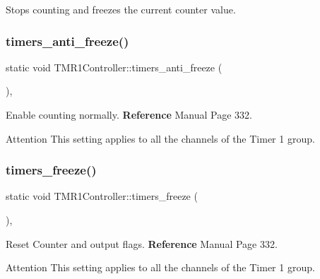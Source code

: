 Stops counting and freezes the current counter value. 

\mbox{\label{classTMR1Controller_acb383aa5321f552f018e4e217e2211f4}} 
\subsubsection{\texorpdfstring{timers\+\_\+anti\+\_\+freeze()}{timers\_anti\_freeze()}}
{\footnotesize\ttfamily static void T\+M\+R1\+Controller\+::timers\+\_\+anti\+\_\+freeze (\begin{DoxyParamCaption}{ }\end{DoxyParamCaption})\hspace{0.3cm}{\ttfamily [inline]}, {\ttfamily [static]}}



Enable counting normally. {\bfseries Reference} Manual Page 332. 

\begin{DoxyAttention}{Attention}
This setting applies to all the channels of the Timer 1 group. 
\end{DoxyAttention}
\mbox{\label{classTMR1Controller_aa00df5e2d591a36b1049275c9a293c51}} 
\subsubsection{\texorpdfstring{timers\+\_\+freeze()}{timers\_freeze()}}
{\footnotesize\ttfamily static void T\+M\+R1\+Controller\+::timers\+\_\+freeze (\begin{DoxyParamCaption}{ }\end{DoxyParamCaption})\hspace{0.3cm}{\ttfamily [inline]}, {\ttfamily [static]}}



Reset Counter and output flags. {\bfseries Reference} Manual Page 332. 

\begin{DoxyAttention}{Attention}
This setting applies to all the channels of the Timer 1 group. 
\end{DoxyAttention}


